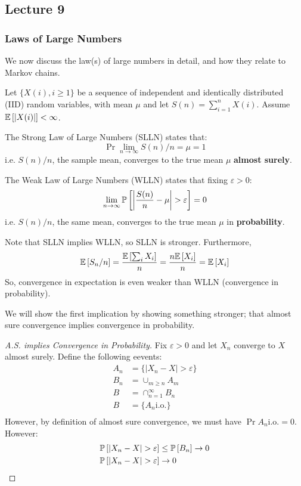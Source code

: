 \subsection{Lecture 9}

\subsubsection{Laws of Large Numbers}
We now discuss the law(s) of large numbers in detail, and how they relate to Markov chains.

\begin{theorem} 
    Let $\{X(i), i \geq 1\}$ be a sequence of independent and identically distributed (IID) random variables,
    with mean $\mu$ and let $S(n) = \sum_{i = 1}^n X(i)$. Assume $\mathbb{E}\left[ \abs{X(i)} \right] < \infty$.

    The Strong Law of Large Numbers (SLLN) states that:
    \[ \Pr{\lim_{n\to\infty} S(n)/n = \mu} = 1 \]
    i.e. $S(n)/n$, the sample mean, converges to the true mean $\mu$ \textbf{almost surely}.

    The Weak Law of Large Numbers (WLLN) states that fixing $\varepsilon > 0$:
    \[ \lim_{n \to \infty} \mathbb{P}\left[ \abs{\frac{S(n)}{n} - \mu} > \varepsilon \right] = 0 \]
    i.e. $S(n)/n$, the same mean, converges to the true mean $\mu$ in \textbf{probability}.
\end{theorem}

Note that SLLN implies WLLN, so SLLN is stronger. Furthermore, 
\[ \mathbb{E}\left[ S_n/n \right] = \frac{\mathbb{E}\left[ \sum_i X_i \right]}{n} = \frac{n \mathbb{E}\left[ X_i \right]}{n} = \mathbb{E}\left[ X_i \right] \]
So, convergence in expectation is even weaker than WLLN (convergence in probability).

We will show the first implication by showing something stronger; that almost sure convergence implies convergence in probability.

\begin{proof} [A.S. implies Convergence in Probability]
    Fix $\varepsilon > 0$ and let $X_n$ converge to $X$ almost surely. Define the following eevents:
    \begin{align*}
        A_n &= \{ |X_n - X| > \varepsilon \} \\
        B_n &= \cup_{m \geq n} A_m \\
        B &= \cap_{n = 1}^{\infty} B_n \\
        B &= \{ A_n \text{i.o.} \} \\
    \end{align*}
    However, by definition of almost sure convergence, we must have $\Pr{A_n \text{i.o.}} = 0$. However:
    \begin{align*}
        \mathbb{P}\left[ \abs{X_n - X} > \varepsilon \right] &\leq \mathbb{P}\left[ B_n \right] \to 0 \\
        \mathbb{P}\left[ \abs{X_n - X} > \varepsilon \right] &\to 0
    \end{align*}
\end{proof}

